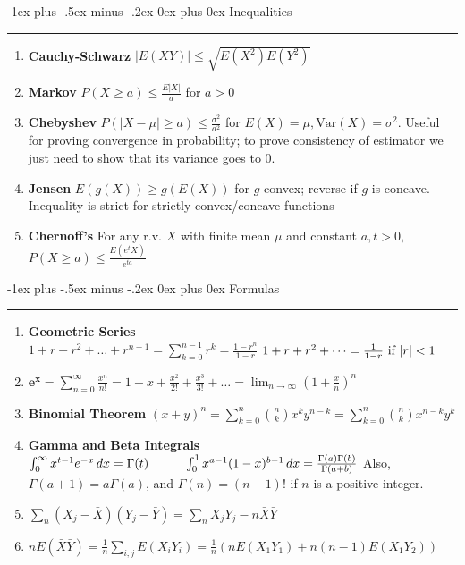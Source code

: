 \documentclass[10pt,landscape]{article}
\makeatletter
\newcommand{\var}{\textrm{Var}}
\renewcommand{\section}{\@startsection{section}{1}{0mm}%
                                {-1ex plus -.5ex minus -.2ex}%
                                {0ex plus 0ex}%
                                {\normalfont\medium\bfseries}}
\makeatother
\begin{document}
\begin{multicols*}{3}
\section{Inequalities} \hrule height 1pt \smallskip

\begin{enumerate}
\itemsep0em
\item \textbf{Cauchy-Schwarz} $|E(XY)| \leq \sqrt{E(X^2)E(Y^2)}$
\item \textbf{Markov} $P(X \geq a) \leq \frac{E|X|}{a}$ for $a>0$
\item \textbf{Chebyshev} $P(|X - \mu| \geq a) \leq \frac{\sigma^2}{a^2}$ for $E(X)=\mu, \var(X) = \sigma^2$. Useful for proving convergence in probability; to prove consistency of estimator we just need to show that its variance goes to 0.
\item \textbf{Jensen} $E(g(X)) \geq g(E(X))$ for $g$ convex; reverse if $g$ is concave. Inequality is strict for strictly convex/concave functions
\item \textbf{Chernoff's} For any r.v. $X$ with finite mean $\mu$ and constant $a,t > 0$, $P(X \geq a) \leq \frac{E(e^tX)}{e^{ta}}$
\end{enumerate}


\section{Formulas} \hrule height 1pt \smallskip
\begin{enumerate}
    \itemsep0em
    \item \textbf{Geometric Series } \\
    $1 + r + r^2 + \dots + r^{n-1} = \sum_{k=0}^{n-1} r^k = \frac{1 - r^n}{1 -r}$
    $1 + r + r^2 + \dots = \frac{1}{1-r} \textnormal{ if $|r|<1$}$
    \item $\mathbf{e^x} = \sum_{n=0}^\infty \frac{x^n}{n!}= 1 + x + \frac{x^2}{2!} + \frac{x^3}{3!} + \dots = \lim_{n \rightarrow \infty} \left( 1 + \frac{x}{n} \right)^n$
    \item \textbf{Binomial Theorem} $(x+y)^n=\sum_{k=0}^n {n\choose k} x^k y^{n-k}=\sum_{k=0}^n {n\choose k} x^{n-k} y^k$
    \item \textbf{Gamma and Beta Integrals}
    $ \int_0^\infty x^{t-1}e^{-x}\, dx = \Gamma(t) \hspace{1 cm} \int_0^1 x^{a - 1}(1-x)^{b-1}\, dx = \frac{\Gamma(a)\Gamma(b)}{\Gamma(a + b)}$
    Also, $\Gamma(a+1) = a \Gamma(a)$, and $\Gamma(n) = (n - 1)!$ if $n$ is a positive integer. 
    \item $\sum_n (X_j - \bar X)(Y_j - \bar Y) = \sum_n X_jY_j - n\bar X \bar Y$
    \item $nE(\bar X \bar Y) = \frac{1}{n}\sum_{i,j}E(X_iY_i) = \frac{1}{n}(nE(X_1Y_1) + n(n-1)E(X_1Y_2))$
\end{enumerate}


\end{multicols*}
\end{document}
